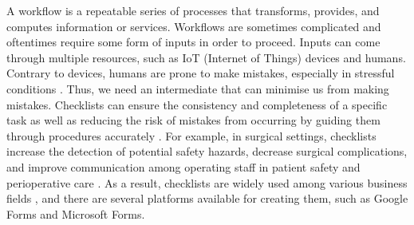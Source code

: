 
A workflow is a repeatable series of processes that transforms, provides, and computes information or services. 
Workflows are sometimes complicated and oftentimes require some form of inputs in order to proceed.
Inputs can come through multiple resources, such as IoT (Internet of Things) devices \cite{iotworkflows, iotfogworkflows} and humans.
Contrary to devices, humans are prone to make mistakes, especially in stressful conditions \cite{humanerrors}.
Thus, we need an intermediate that can minimise us from making mistakes.
Checklists can ensure the consistency and completeness of a specific task as well as reducing the risk of mistakes from occurring by guiding them through procedures accurately \cite{checklistperfimprove}.
For example, in surgical settings, checklists increase the detection of potential safety hazards, decrease surgical complications, and improve communication among operating staff in patient safety and perioperative care \cite{surgicalex}.
As a result, checklists are widely used among various business fields \cite{checklistperfimprove}, and there are several platforms available for creating them, such as Google Forms and Microsoft Forms.



